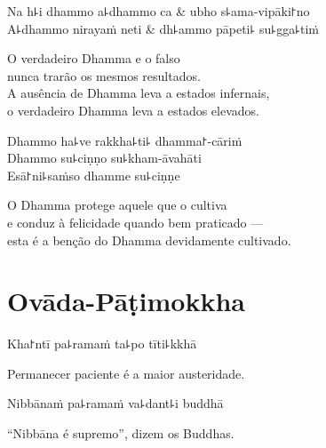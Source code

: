 \clearpage

\begin{twochants}
  Na h꜕i dhammo a꜕dhammo ca & ubho s꜕ama-vipāki꜓no \\
  A꜕dhammo nirayaṁ neti & dh꜕ammo pāpeti꜕ su꜕gga꜕tiṁ \\
\end{twochants}

\begin{english}
  O verdadeiro Dhamma e o falso\\
  nunca trarão os mesmos resultados.\\
  A ausência de Dhamma leva a estados infernais,\\
  o verdadeiro Dhamma leva a estados elevados.
\end{english}

Dhammo ha꜕ve rakkha꜕ti꜕ dhamma꜓-cāriṁ\\
Dhammo su꜕ciṇṇo su꜕kham-āvahāti\\
Esā꜓ni꜕saṁso dhamme su꜕ciṇṇe


\begin{english}
  O Dhamma protege aquele que o cultiva\\
  e conduz à felicidade quando bem praticado ---\\
  esta é a benção do Dhamma devidamente cultivado.
\end{english}

\chapter{Ovāda-Pāṭimokkha}


\enlargethispage{\baselineskip}

\begin{leader}
\end{leader}

Kha꜓ntī pa꜕ramaṁ ta꜕po tīti꜕kkhā

\begin{english}
  Permanecer paciente é a maior austeridade.
\end{english}

Nibbānaṁ pa꜕ramaṁ va꜕dant꜕i buddhā

\begin{english}
  “Nibbāna é supremo”, dizem os Buddhas.
\end{english}

